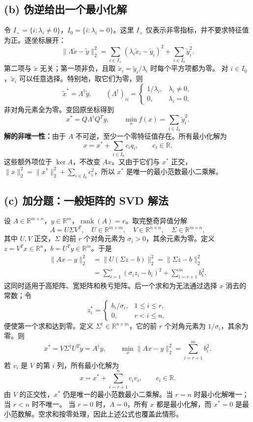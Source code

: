 \documentclass[11pt,UTF8,fontset=windows]{ctexart}
\newcommand{\R}{\mathbb R}
\begin{document}
\subsection*{(b) 伪逆给出一个最小化解}
令 $I_+=\{i:\lambda_i\ne0\}$，$I_0=\{i:\lambda_i=0\}$。这里 $I_+$ 仅表示非零指标，并不要求特征值为正。逐坐标展开：
\[
 \|\Lambda\widetilde x-\widetilde y\|_2^2
 =\sum_{i\in I_+}(\lambda_i\widetilde x_i-\widetilde y_i)^2
  +\sum_{i\in I_0}\widetilde y_i^2.
\]
第二项与 $\widetilde x$ 无关；第一项非负，且取
$\widetilde x_i=\widetilde y_i/\lambda_i$ 时每个平方项都为零。
对 $i\in I_0$，$\widetilde x_i$ 可以任意选择。特别地，取它们为零，则
\[
 \widetilde x^*=\Lambda^\dagger\widetilde y,
 \qquad (\Lambda^\dagger)_{ii}=\begin{cases}1/\lambda_i,&\lambda_i\ne0,\\0,&\lambda_i=0,\end{cases}
\]
非对角元素全为零。变回原坐标得到
\[\boxed{x^*=Q\Lambda^\dagger Q^Ty},\qquad
 \boxed{\min_x f(x)=\sum_{i\in I_0}\widetilde y_i^2}.\]
\textbf{解的非唯一性：}由于 $A$ 不可逆，至少一个零特征值存在。所有最小化解为
\[
 x=x^*+\sum_{i\in I_0}c_iq_i,\qquad c_i\in\R.
\]
这些额外项位于 $\ker A$，不改变 $Ax$。又由于它们与 $x^*$ 正交，
$\|x\|_2^2=\|x^*\|_2^2+\sum_{i\in I_0}c_i^2$，所以 $x^*$ 是唯一的最小范数最小二乘解。
\newpage
\subsection*{(c) 加分题：一般矩阵的 SVD 解法}
设 $A\in\R^{m\times n}$，$y\in\R^m$，$\operatorname{rank}(A)=r$。取完整奇异值分解
\[
 A=U\Sigma V^T,\quad U\in\R^{m\times m},\quad
 V\in\R^{n\times n},\quad\Sigma\in\R^{m\times n},
\]
其中 $U,V$ 正交，$\Sigma$ 的前 $r$ 个对角元素为 $\sigma_i>0$，其余元素为零。定义
$z=V^Tx\in\R^n$，$b=U^Ty\in\R^m$。于是
\begin{align*}
 \|Ax-y\|_2^2
 &=\|U(\Sigma z-b)\|_2^2=\|\Sigma z-b\|_2^2\\
 &=\sum_{i=1}^r(\sigma_i z_i-b_i)^2+\sum_{i=r+1}^m b_i^2.
\end{align*}
这同时适用于高矩阵、宽矩阵和秩亏矩阵。后一个求和为无法通过选择 $x$ 消去的常数；令
\[
 z_i^*=\begin{cases}b_i/\sigma_i,&1\le i\le r,\\0,&r<i\le n,\end{cases}
\]
便使第一个求和达到零。定义 $\Sigma^\dagger\in\R^{n\times m}$，它的前 $r$ 个对角元素为 $1/\sigma_i$，其余为零。则
\[
 \boxed{x^*=V\Sigma^\dagger U^Ty=A^\dagger y},\qquad
 \boxed{\min_x\|Ax-y\|_2^2=\sum_{i=r+1}^m b_i^2}.
\]
若 $v_i$ 是 $V$ 的第 $i$ 列，所有最小化解为
\[
 x=x^*+\sum_{i=r+1}^n c_iv_i,\qquad c_i\in\R.
\]
由 $V$ 的正交性，$x^*$ 仍是唯一的最小范数最小二乘解。当 $r=n$ 时最小化解唯一；当 $r<n$ 时不唯一。
当 $r=0$ 时，$A=0$，所有 $x$ 都是最小化解，而 $x^*=0$ 是最小范数解。空求和按零处理，因此上述公式也覆盖此情形。
\newpage
\end{document}
